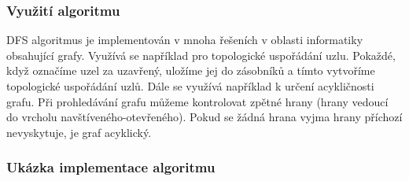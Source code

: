 \documentclass[12pt, titlepage, a4paper]{article}
\begin{document}
\subsubsection{Využití algoritmu}
DFS algoritmus je implementován v mnoha řešeních v oblasti informatiky obsahující grafy. 
Využívá se například pro topologické uspořádání uzlu. Pokaždé, když označíme uzel za uzavřený, 
uložíme jej do zásobníků a tímto vytvoříme topologické uspořádání uzlů.
Dále se využívá například k určení acykličnosti grafu. Při prohledávání grafu můžeme kontrolovat zpětné hrany (hrany 
vedoucí do vrcholu navštíveného-otevřeného). Pokud se žádná hrana vyjma hrany příchozí 
nevyskytuje, je graf acyklický.

\newpage
\subsubsection{Ukázka implementace algoritmu}
\end{document}
